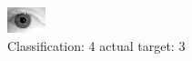 \begin{figure}[h!]
\begin{center}
\includegraphics[width=0.60\columnwidth]{figures/ID2101_class_4_target_3.png}
\end{center}
\caption{ Classification: 4 actual target: 3}
\label{fig:ID2101_class_4_target_3}
\end{figure}
